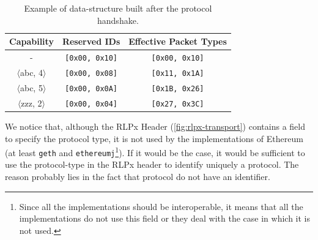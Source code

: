 \begin{table}
  \begin{center}
    \begin{tabular}{c | c | c }
      Capability & Reserved IDs & Effective Packet Types\\
      \hline
      - & \texttt{[0x00, 0x10]} & \texttt{[0x00, 0x10]} \\
      $\langle$abc, 4$\rangle$ & \texttt{[0x00, 0x08]} & \texttt{[0x11, 0x1A]} \\
      $\langle$abc, 5$\rangle$ & \texttt{[0x00, 0x0A]} & \texttt{[0x1B, 0x26]} \\
      $\langle$zzz, 2$\rangle$ & \texttt{[0x00, 0x04]} & \texttt{[0x27, 0x3C]} \\
    \end{tabular}
    \caption{Example of data-structure built after the protocol handshake.}
    \label{table:capabilities}
  \end{center}
\end{table}

We notice that, although the RLPx Header (\autoref{fig:rlpx-transport}) contains
a field to specify the protocol type, it is not used by the implementations of
Ethereum (at least \texttt{geth} and \texttt{ethereumj}\footnote{Since all the
implementations should be interoperable, it means that all the implementations
do not use this field or they deal with the case in which it is not used.}). If
it would be the case, it would be sufficient to use the protocol-type in the
RLPx header to identify uniquely a protocol. The reason probably lies in the
fact that \devpp{} protocol do not have an identifier.
